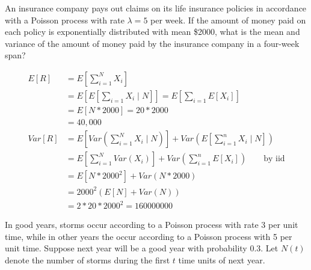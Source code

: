 \documentclass[10pt,a4paper]{exam}
\begin{document}
\begin{questions}
\question An insurance company pays out claims on its life insurance policies in accordance with a Poisson process with rate $\lambda = 5$ per week. If the amount of money paid on each policy is exponentially distributed with mean \$2000, what is the mean and variance of the amount of money paid by the insurance company in a four-week span?

\begin{solution}
\begin{align*}
E[R] 	&= E\left[\sum_{i=1}^N X_i\right]\\
		&= E\left[ E\left[\sum_{i=1} X_i \mid N\right] \right] = E\left[ \sum_{i=1} E[X_i] \right]\\
		&= E[N*2000] = 20*2000\\
		&= 40,000\\
Var[R]		&= E\left[Var\left(\sum_{i=1}^N X_i \mid N \right) \right] + Var\left( E\left[ \sum_{i=1}^n X_i \mid N \right] \right)\\
				&= E\left[ \sum_{i=1}^N Var\left( X_i \right) \right] + Var\left( \sum_{i=1}^n E\left[  X_i \right] \right) \quad \quad \text{by iid}\\
				&= E\left[ N*2000^2\right] + Var\left( N*2000 \right)\\
				&= 2000^2 (E[N] + Var(N))\\
				&= 2*20*2000^2 = 160000000
\end{align*}
\end{solution}

\pagebreak

\question In good years, storms occur according to a Poisson process with rate 3 per unit time, while in other years the occur according to a Poisson process with 5 per unit time. Suppose next year will be a good year with probability 0.3. Let $N(t)$ denote the number of storms during the first $t$ time units of next year.

\begin{parts}

\end{parts}
\end{questions}
\end{document}
